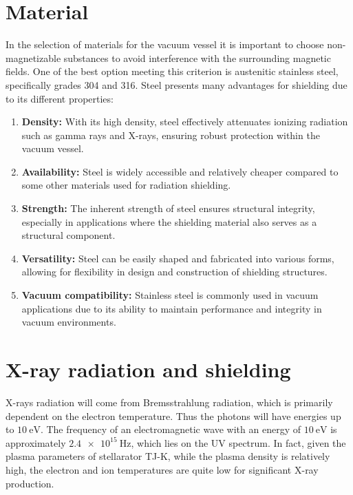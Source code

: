 \section{Material}

In the selection of materials for the vacuum vessel it is important to choose non-magnetizable substances to avoid interference with the surrounding magnetic fields.
One of the best option meeting this criterion is austenitic stainless steel, specifically grades 304 and 316.
Steel presents many advantages for shielding due to its different properties:

\begin{enumerate}
      \item \textbf{Density:}
            With its high density, steel effectively attenuates ionizing radiation such as gamma rays and X-rays, ensuring robust protection within the vacuum vessel.

      \item \textbf{Availability:}
            Steel is widely accessible and relatively cheaper compared to some other materials used for radiation shielding.

      \item \textbf{Strength:}
            The inherent strength of steel ensures structural integrity, especially in applications where the shielding material also serves as a structural component.

      \item \textbf{Versatility:}
            Steel can be easily shaped and fabricated into various forms, allowing for flexibility in design and construction of shielding structures.

      \item \textbf{Vacuum compatibility:}
            Stainless steel is commonly used in vacuum applications due to its ability to maintain performance and integrity in vacuum environments.

\end{enumerate}


\section{X-ray radiation and shielding}

X-rays radiation will come from Bremsstrahlung radiation, which is primarily dependent on the electron temperature.
Thus the photons will have energies up to $\SI{10}{\electronvolt}$.
The frequency of an electromagnetic wave with an energy of $\SI{10}{\electronvolt}$ is approximately $\SI{2.4e15}{\hertz}$, which lies on the UV spectrum.
In fact, given the plasma parameters of stellarator TJ-K, while the plasma density is relatively high, the electron and ion temperatures are quite low for significant X-ray production.

